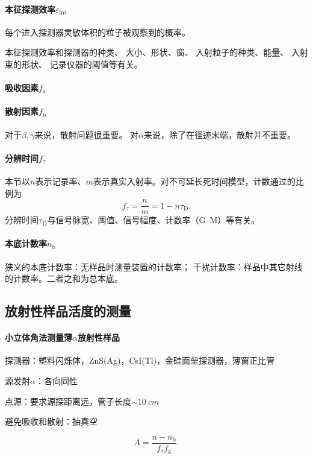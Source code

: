 \paragraph{本征探测效率$\varepsilon_{\mathrm{int}}$}
每个进入探测器灵敏体积的粒子被观察到的概率。

本征探测效率和探测器的种类、
大小、形状、窗、
入射粒子的种类、能量、
入射束的形状、
记录仪器的阈值等有关。
\paragraph{吸收因素$f_{\mathrm{a}}$}
\paragraph{散射因素$f_{\mathrm{b}}$}
对于$\beta,\gamma$来说，散射问题很重要。
对$\alpha$来说，除了在径迹末端，散射并不重要。
\paragraph{分辨时间$f_\tau$}
本节以$n$表示记录率、$m$表示真实入射率。对不可延长死时间模型，计数通过的比例为
\begin{equation}\label{eq:nrd-dead-time-correction}
	f_\tau = \frac nm = 1 - n\tau_{\mathrm{D}}.
\end{equation}
分辨时间$\tau_{\mathrm{D}}$与信号脉宽、阈值、信号幅度、计数率（G--M）等有关。
\paragraph{本底计数率$n_{\mathrm{b}}$}
狭义的本底计数率：无样品时测量装置的计数率；
干扰计数率：样品中其它射线的计数率。二者之和为总本底。

\subsection{\alpharay 放射性样品活度的测量}

\paragraph{小立体角法测量薄$\alpha$放射性样品}
\begin{compactitem}
	\item 探测器：塑料闪烁体，ZnS(Ag)，CsI(Tl)，金硅面垒探测器，薄窗正比管
	\item 源发射$\alpha$：各向同性
	\item 点源：要求源探距离远，管子长度$\sim \qty{10}{cm}$
	\item 避免吸收和散射：抽真空
\end{compactitem}
\begin{equation}\label{eq:nrd-absolute-activity}
	A = \frac{n - n_\mathrm b}{f_\tau f_{\mathrm{g}}}.
\end{equation}
